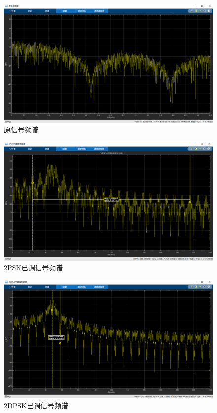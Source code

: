 \documentclass[11pt]{paper}
\begin{document}
\begin{figure}[H]
    \centering
    \includegraphics[width=5.9in]{texture/result/原信号频谱.png}
    \caption{原信号频谱}
    \label{原信号频谱}
\end{figure}

\begin{figure}[H]
    \centering
    \includegraphics[width=5.9in]{texture/result/2psk频谱.png}
    \caption{2PSK已调信号频谱}
    \label{2PSK已调信号频谱}
\end{figure}

\begin{figure}[H]
    \centering
    \includegraphics[width=5.9in]{texture/result/2dpsk频谱.png}
    \caption{2DPSK已调信号频谱}
    \label{2DPSK已调信号频谱}
\end{figure}
\end{document}
